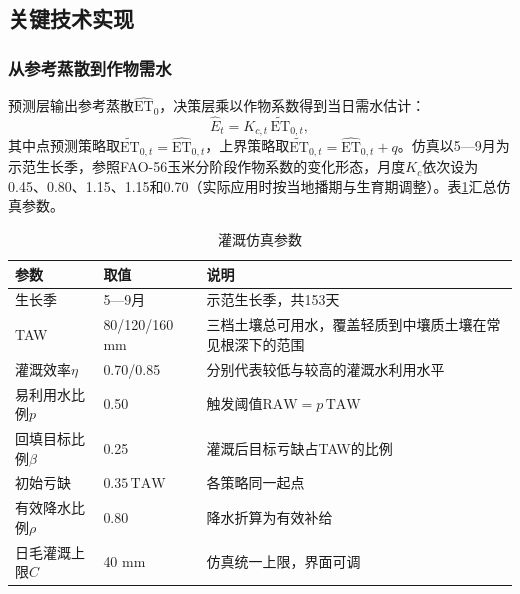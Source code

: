 \subsection{关键技术实现}
\subsubsection{从参考蒸散到作物需水}
预测层输出参考蒸散$\widehat{\mathrm{ET}}_0$，决策层乘以作物系数得到当日需水估计：
\begin{equation}\label{eq:crop}
\widehat E_t=K_{c,t}\,\widetilde{\mathrm{ET}}_{0,t},
\end{equation}
其中点预测策略取$\widetilde{\mathrm{ET}}_{0,t}=\widehat{\mathrm{ET}}_{0,t}$，上界策略取$\widetilde{\mathrm{ET}}_{0,t}=\widehat{\mathrm{ET}}_{0,t}+q$。仿真以5—9月为示范生长季，参照FAO-56玉米分阶段作物系数的变化形态，月度$K_c$依次设为0.45、0.80、1.15、1.15和0.70（实际应用时按当地播期与生育期调整）。表\ref{tab:assumptions}汇总仿真参数。

\begin{table}[H]\centering\small
\caption{灌溉仿真参数}\label{tab:assumptions}
\begin{tabularx}{\linewidth}{@{}l l X@{}}\toprule
参数 & 取值 & 说明\\\midrule
生长季 & 5—9月 & 示范生长季，共153天\\
TAW & 80/120/160 mm & 三档土壤总可用水，覆盖轻质到中壤质土壤在常见根深下的范围\\
灌溉效率$\eta$ & 0.70/0.85 & 分别代表较低与较高的灌溉水利用水平\\
易利用水比例$p$ & 0.50 & 触发阈值$\mathrm{RAW}=p\,\mathrm{TAW}$\\
回填目标比例$\beta$ & 0.25 & 灌溉后目标亏缺占TAW的比例\\
初始亏缺 & $0.35\,\mathrm{TAW}$ & 各策略同一起点\\
有效降水比例$\rho$ & 0.80 & 降水折算为有效补给\\
日毛灌溉上限$C$ & 40 mm & 仿真统一上限，界面可调\\\bottomrule
\end{tabularx}
\end{table}

